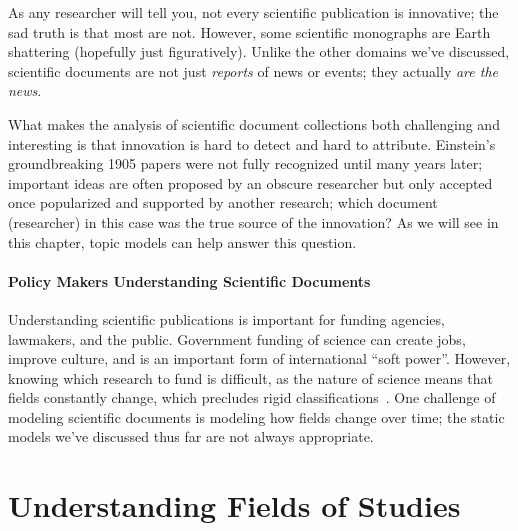 As any researcher will tell you, not every scientific publication is innovative;
the sad truth is that most are not.  However, some scientific monographs are
Earth shattering (hopefully just figuratively).  Unlike the other domains we've
discussed, scientific documents are not just \emph{reports} of news or events;
they actually \emph{are the news}.

What makes the analysis of scientific document collections both challenging and
interesting is that innovation is hard to detect and hard to attribute.
Einstein's groundbreaking 1905 papers were not fully recognized until many years
later; important ideas are often proposed by an obscure researcher but only accepted
once popularized and supported by another research; which document (researcher)
in this case was the true source of the innovation?  As we will see in this
chapter, topic models can help answer this question.

\paragraph{Policy Makers Understanding Scientific Documents}

Understanding scientific publications is important for funding agencies,
lawmakers, and the public.  Government funding of science can create jobs,
improve culture, and is an important form of international ``soft power''.
However, knowing which research to fund is difficult, as the nature of science
means that fields constantly change, which precludes rigid
classifications~\citep{szostak-04}.  One challenge of modeling scientific
documents is modeling how fields change over time; the static models we've
discussed thus far are not always appropriate.

\section{Understanding Fields of Studies}
\label{sec:sci_fields}

